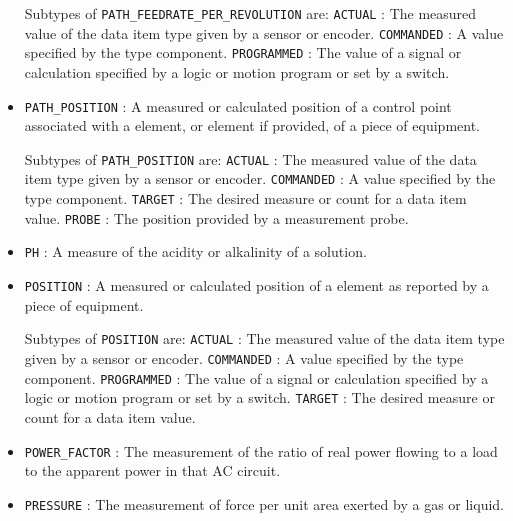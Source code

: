 \begin{itemize}
Subtypes of \texttt{PATH_FEEDRATE_PER_REVOLUTION} are: 
\newline\tab \texttt{ACTUAL} : The measured value of the data item type given by a sensor or encoder. 
\newline\tab \texttt{COMMANDED} : A value specified by the  type component. 
\newline\tab \texttt{PROGRAMMED} : The value of a signal or calculation specified by a logic or motion program or set by a switch. 
\item \texttt{PATH_POSITION} : A measured or calculated position of a control point associated with a  element, or  element if provided, of a piece of equipment. 

Subtypes of \texttt{PATH_POSITION} are: 
\newline\tab \texttt{ACTUAL} : The measured value of the data item type given by a sensor or encoder. 
\newline\tab \texttt{COMMANDED} : A value specified by the  type component. 
\newline\tab \texttt{TARGET} : The desired measure or count for a data item value. 
\newline\tab \texttt{PROBE} : The position provided by a measurement probe. 
\item \texttt{PH} : A measure of the acidity or alkalinity of a solution. 

\item \texttt{POSITION} : A measured or calculated position of a  element as reported by a piece of equipment. 

Subtypes of \texttt{POSITION} are: 
\newline\tab \texttt{ACTUAL} : The measured value of the data item type given by a sensor or encoder. 
\newline\tab \texttt{COMMANDED} : A value specified by the  type component. 
\newline\tab \texttt{PROGRAMMED} : The value of a signal or calculation specified by a logic or motion program or set by a switch. 
\newline\tab \texttt{TARGET} : The desired measure or count for a data item value. 
\item \texttt{POWER_FACTOR} : The measurement of the ratio of real power flowing to a load to the apparent power in that AC circuit. 

\item \texttt{PRESSURE} : The measurement of force per unit area exerted by a gas or liquid. 


\end{itemize}
